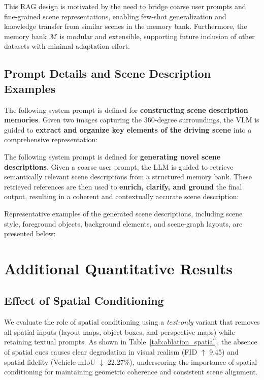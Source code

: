 This RAG design is motivated by the need to bridge coarse user prompts and fine-grained scene representations, enabling few-shot generalization and knowledge transfer from similar scenes in the memory bank. Furthermore, the memory bank $\mathcal{M}$ is modular and extensible, supporting future inclusion of other datasets with minimal adaptation effort.



\clearpage
\subsection{Prompt Details and Scene Description Examples}
The following system prompt is defined for \textbf{constructing scene description memories}. Given two images capturing the 360-degree surroundings, the VLM is guided to \textbf{extract and organize key elements of the driving scene} into a comprehensive representation:


The following system prompt is defined for \textbf{generating novel scene descriptions}. Given a coarse user prompt, the LLM is guided to retrieve semantically relevant scene descriptions from a structured memory bank. These retrieved references are then used to \textbf{enrich, clarify, and ground} the final output, resulting in a coherent and contextually accurate scene description:


Representative examples of the generated scene descriptions, including scene style, foreground objects, background elements, and scene-graph layouts, are presented below:




\clearpage
\section{Additional Quantitative Results}



\subsection{Effect of Spatial Conditioning}
We evaluate the role of spatial conditioning using a \textit{text-only} variant that removes all spatial inputs (layout maps, object boxes, and perspective maps) while retaining textual prompts. As shown in Table~\ref{tab:ablation_spatial}, the absence of spatial cues causes clear degradation in visual realism (FID $\uparrow$ 9.45) and spatial fidelity (Vehicle mIoU $\downarrow$ 22.27\%), underscoring the importance of spatial conditioning for maintaining geometric coherence and consistent scene alignment.


